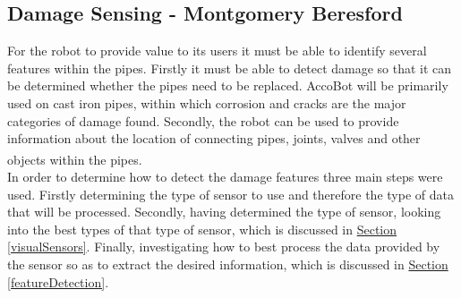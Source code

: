 \documentclass[11pt]{article}		%
\newcommand{\supercite}[1]{\textsuperscript{\cite{#1}}}		%
\newcommand{\sectref}[1]{\hyperref[#1]{Section \ref*{#1}}}     %
\begin{document}
	        
	        \subsection[Damage Sensing]{Damage Sensing - Montgomery Beresford}
	        
	        For the robot to provide value to its users it must be able to identify several features within the pipes. 
	        Firstly it must be able to detect damage so that it can be determined whether the pipes need to be replaced.
	        AccoBot will be primarily used on cast iron pipes, within which corrosion and cracks are the major categories of damage found.  
	        Secondly, the robot can be used to provide information about the location of connecting pipes, joints, valves and other objects within the pipes.\supercite{Failure_pipes}\supercite{Failure_pipes2}
	        \\
	        In order to determine how to detect the damage features three main steps were used. 
	        Firstly determining the type of sensor to use and therefore the type of data that will be processed. 
	        Secondly, having determined the type of sensor, looking into the best types of that type of sensor, which is discussed in \sectref{visualSensors}.
	        Finally, investigating how to best process the data provided by the sensor so as to extract the desired information, which is discussed in \sectref{featureDetection}.
	        
\end{document}
